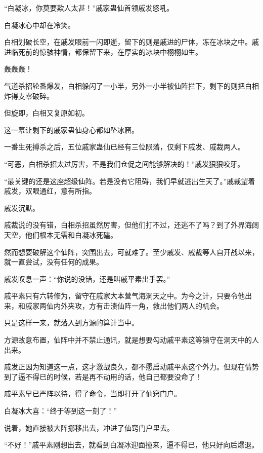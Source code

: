 
\begin{this_body}

“白凝冰，你莫要欺人太甚！”戚家蛊仙首领戚发怒吼。

白凝冰心中却在冷笑。

白相划破长空，在戚发眼前一闪即逝，留下的则是戚进的尸体，冻在冰块之中。戚进临死前的惊骇神情，都保留下来，在厚实的冰块中栩栩如生。

轰轰轰！

气道杀招轮番爆发，白相躲闪了一小半，另外一小半被仙阵拦下，剩下的则把白相炸得支零破碎。

但旋即，白相又复原如初。

这一幕让剩下的戚家蛊仙身心都如坠冰窟。

一番生死搏杀之后，五位戚家蛊仙已经有三位陨落，仅剩下戚发、戚裁两人。

“可恶，白相杀招太过厉害，不是我们仓促之间能够解决的！”戚发狠狠咬牙。

“最关键的还是这座超级仙阵。若是没有它阻碍，我们早就逃出生天了。”戚裁望着戚发，双眼通红，意有所指。

戚发沉默。

戚裁说的没有错，白相杀招虽然厉害，但他们打不过，还逃不了吗？到了外界海阔天空，他们根本无需和白凝冰死磕。

然而想要破解这个仙阵，突围出去，可就难了。至少戚发、戚裁等人自开战以来，就一直尝试，没有任何的成果。

戚发叹息一声：“你说的没错，还是叫戚平素出手罢。”

戚平素只有六转修为，留守在戚家大本营气海洞天之中。为今之计，只要令他出来，和戚家两仙内外夹攻，方有击溃仙阵一角，救出他们两人的机会。

只是这样一来，就落入到方源的算计当中。

方源故意布置，仙阵中并不禁止通讯，就是想要勾动戚平素这等镇守在洞天中的人出来。

戚发正因为知道这一点，这才激战良久，都不愿启动戚平素这个外力。但现在情势到了逼不得已的时候，若是再不动用的话，他自己都要没命了！

戚平素早已严阵以待，得了命令，当即打开了仙窍门户。

白凝冰大喜：“终于等到这一刻了！”

说着，她直接被大阵挪移出去，冲进了仙窍门户里去。

“不好！”戚平素刚想出去，就看到白凝冰迎面撞来，逼不得已，他只好向后爆退。


\end{this_body}
